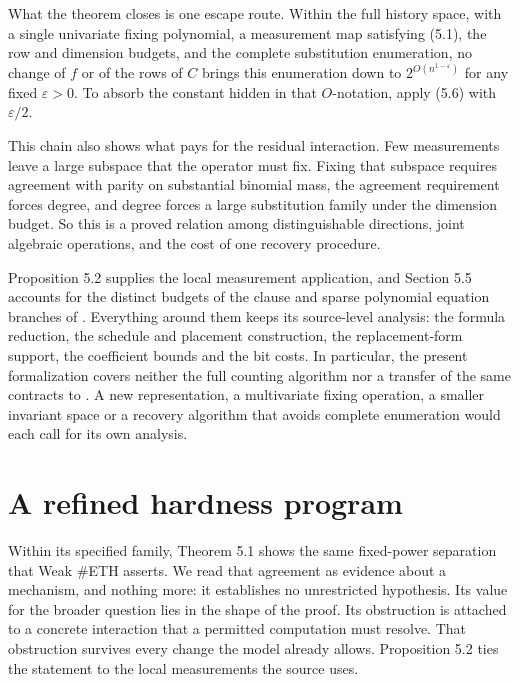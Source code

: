 \documentclass[11pt,letterpaper]{article}
\begin{document}
What the theorem closes is one escape route. Within the full history
space, with a single univariate fixing polynomial, a measurement map
satisfying (5.1), the row and dimension budgets, and the complete
substitution enumeration, no change of \(f\) or of the rows of \(C\)
brings this enumeration down to \(2^{O(n^{1-\varepsilon})}\) for any
fixed \(\varepsilon>0\). To absorb the constant hidden in that
\(O\)-notation, apply (5.6) with \(\varepsilon/2\).

This chain also shows what pays for the residual interaction. Few
measurements leave a large subspace that the operator must fix. Fixing
that subspace requires agreement with parity on substantial binomial
mass, the agreement requirement forces degree, and degree forces a large
substitution family under the dimension budget. So this is a proved
relation among distinguishable directions, joint algebraic operations,
and the cost of one recovery procedure.

Proposition 5.2 supplies the local measurement application, and Section
5.5 accounts for the distinct budgets of the clause and sparse
polynomial equation branches of \citep{O26}. Everything around them
keeps its source-level analysis: the formula reduction, the schedule and
placement construction, the replacement-form support, the coefficient
bounds and the bit costs. In particular, the present formalization
covers neither the full counting algorithm nor a transfer of the same
contracts to \citep{Ant26}. A new representation, a multivariate fixing
operation, a smaller invariant space or a recovery algorithm that avoids
complete enumeration would each call for its own analysis.

\section{A refined hardness program}\label{a-refined-hardness-program}

Within its specified family, Theorem 5.1 shows the same fixed-power
separation that Weak \#ETH asserts. We read that agreement as evidence
about a mechanism, and nothing more: it establishes no unrestricted
hypothesis. Its value for the broader question lies in the shape of the
proof. Its obstruction is attached to a concrete interaction that a
permitted computation must resolve. That obstruction survives every
change the model already allows. Proposition 5.2 ties the statement to
the local measurements the source uses.
\end{document}
